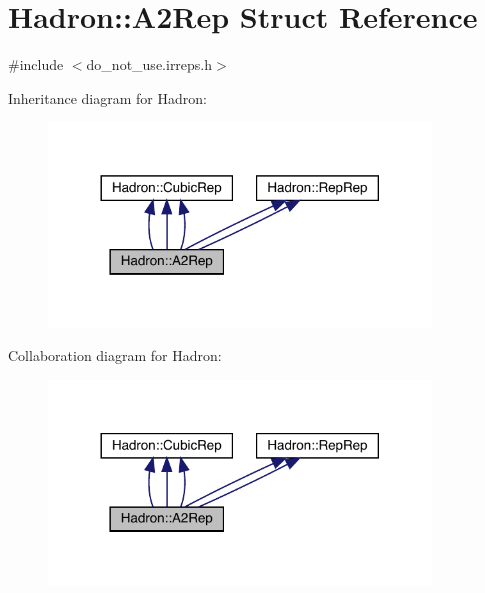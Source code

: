 \hypertarget{structHadron_1_1A2Rep}{}\section{Hadron\+:\+:A2\+Rep Struct Reference}
\label{structHadron_1_1A2Rep}


{\ttfamily \#include $<$do\+\_\+not\+\_\+use.\+irreps.\+h$>$}



Inheritance diagram for Hadron\+:
\nopagebreak
\begin{figure}[H]
\begin{center}
\leavevmode
\includegraphics[width=288pt]{dd/db7/structHadron_1_1A2Rep__inherit__graph}
\end{center}
\end{figure}


Collaboration diagram for Hadron\+:
\nopagebreak
\begin{figure}[H]
\begin{center}
\leavevmode
\includegraphics[width=288pt]{de/ddf/structHadron_1_1A2Rep__coll__graph}
\end{center}
\end{figure}
